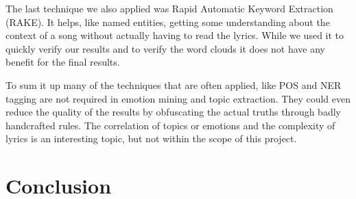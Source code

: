 \documentclass[10pt,a4paper]{article}
\begin{document}
	The last technique we also applied was Rapid Automatic Keyword Extraction (RAKE). It helps, like named entities, getting some understanding about the context of a song without actually having to read the lyrics. While we used it to quickly verify our results and to verify the word clouds it does not have any benefit for the final results.
	
	To sum it up many of the techniques that are often applied, like POS and NER tagging are not required in emotion mining and topic extraction. They could even reduce the quality of the results by obfuscating the actual truths through badly handcrafted rules. The correlation of topics or emotions and the complexity of lyrics is an interesting topic, but not within the scope of this project. 
	

	\section{Conclusion}
	\label{sec:conclusion}
	
	\newpage
	
	
	
	
\end{document}
